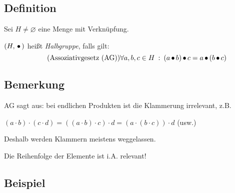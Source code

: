 \subsection{Definition}

Sei $H \neq \varnothing$ eine Menge mit Verknüpfung.

$(H, \,{\bullet}\,)$ heißt \emph{Halbgruppe}, falls gilt:
\[ \tag{Assoziativgesetz (AG)}
\forall a, b, c \in H \::\: (a \,{\bullet}\, b) \,{\bullet}\, c = a \,{\bullet}\, (b \,{\bullet}\, c)
\]

\subsection{Bemerkung}

AG sagt aus: bei endlichen Produkten ist die Klammerung irrelevant, z.B.

$(a \cdot b) \cdot (c \cdot d) = ((a \cdot b) \cdot c) \cdot d = (a \cdot (b \cdot c)) \cdot d$ \:(usw.)

Deshalb werden Klammern meistens weggelassen.

Die Reihenfolge der Elemente ist i.A. relevant!

\subsection{Beispiel} \label{bspHalbgruppe}

